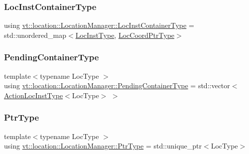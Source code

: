 \subsubsection{\texorpdfstring{Loc\+Inst\+Container\+Type}{LocInstContainerType}}
{\footnotesize\ttfamily using \hyperlink{structvt_1_1location_1_1_location_manager_adf4df6480ad89271a802d6d59bcf424e}{vt\+::location\+::\+Location\+Manager\+::\+Loc\+Inst\+Container\+Type} =  std\+::unordered\+\_\+map$<$\hyperlink{namespacevt_1_1location_a4db6456e8024af2d23fc5ae560fef866}{Loc\+Inst\+Type}, \hyperlink{structvt_1_1location_1_1_location_manager_a98ed824c058080e538546fc731cb8f4c}{Loc\+Coord\+Ptr\+Type}$>$}

\mbox{\label{structvt_1_1location_1_1_location_manager_aad005a828c535232cd6b63859b25b171}} 
\subsubsection{\texorpdfstring{Pending\+Container\+Type}{PendingContainerType}}
{\footnotesize\ttfamily template$<$typename Loc\+Type $>$ \\
using \hyperlink{structvt_1_1location_1_1_location_manager_aad005a828c535232cd6b63859b25b171}{vt\+::location\+::\+Location\+Manager\+::\+Pending\+Container\+Type} =  std\+::vector$<$\hyperlink{structvt_1_1location_1_1_location_manager_a6de3841092c537efc5fb8376128bfe18}{Action\+Loc\+Inst\+Type}$<$Loc\+Type$>$ $>$}

\mbox{\label{structvt_1_1location_1_1_location_manager_a32d8bca6ed6909a2190286408335d3b4}} 
\subsubsection{\texorpdfstring{Ptr\+Type}{PtrType}}
{\footnotesize\ttfamily template$<$typename Loc\+Type $>$ \\
using \hyperlink{structvt_1_1location_1_1_location_manager_a32d8bca6ed6909a2190286408335d3b4}{vt\+::location\+::\+Location\+Manager\+::\+Ptr\+Type} =  std\+::unique\+\_\+ptr$<$Loc\+Type$>$}

